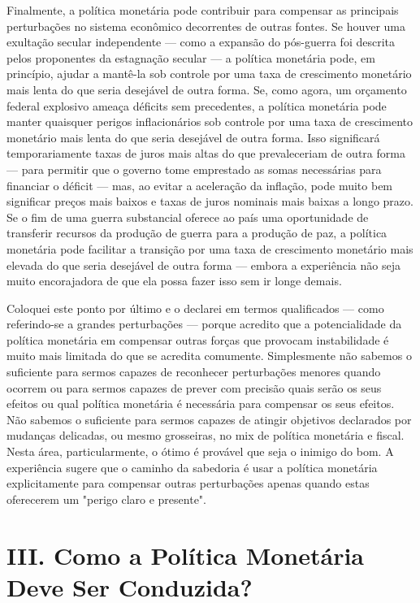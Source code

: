 \documentclass[12pt]{article}
\begin{document}
Finalmente, a política monetária pode contribuir para compensar as principais perturbações no sistema econômico decorrentes de outras fontes. Se houver uma exultação secular independente — como a expansão do pós-guerra foi descrita pelos proponentes da estagnação secular — a política monetária pode, em princípio, ajudar a mantê-la sob controle por uma taxa de crescimento monetário mais lenta do que seria desejável de outra forma. Se, como agora, um orçamento federal explosivo ameaça déficits sem precedentes, a política monetária pode manter quaisquer perigos inflacionários sob controle por uma taxa de crescimento monetário mais lenta do que seria desejável de outra forma. Isso significará temporariamente taxas de juros mais altas do que prevaleceriam de outra forma — para permitir que o governo tome emprestado as somas necessárias para financiar o déficit — mas, ao evitar a aceleração da inflação, pode muito bem significar preços mais baixos e taxas de juros nominais mais baixas a longo prazo. Se o fim de uma guerra substancial oferece ao país uma oportunidade de transferir recursos da produção de guerra para a produção de paz, a política monetária pode facilitar a transição por uma taxa de crescimento monetário mais elevada do que seria desejável de outra forma — embora a experiência não seja muito encorajadora de que ela possa fazer isso sem ir longe demais.

Coloquei este ponto por último e o declarei em termos qualificados — como referindo-se a grandes perturbações — porque acredito que a potencialidade da política monetária em compensar outras forças que provocam instabilidade é muito mais limitada do que se acredita comumente. Simplesmente não sabemos o suficiente para sermos capazes de reconhecer perturbações menores quando ocorrem ou para sermos capazes de prever com precisão quais serão os seus efeitos ou qual política monetária é necessária para compensar os seus efeitos. Não sabemos o suficiente para sermos capazes de atingir objetivos declarados por mudanças delicadas, ou mesmo grosseiras, no mix de política monetária e fiscal. Nesta área, particularmente, o ótimo é provável que seja o inimigo do bom. A experiência sugere que o caminho da sabedoria é usar a política monetária explicitamente para compensar outras perturbações apenas quando estas oferecerem um "perigo claro e presente".

\section*{III. Como a Política Monetária Deve Ser Conduzida?}
\end{document}
